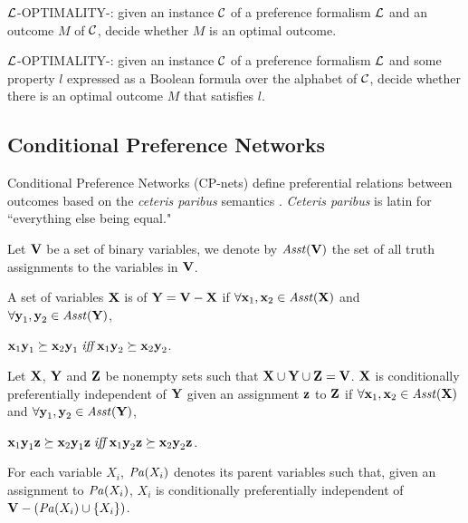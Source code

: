 \begin{definition}
\label{def:opt2}
  $\mathcal{L}$-OPTIMALITY-: given an instance $\mathcal{C}$ of a preference
	formalism $\mathcal{L}$ and an outcome $M$ of $\mathcal{C}$,
  decide whether $M$ is an optimal outcome.
\end{definition}

\begin{definition}
\label{def:opt3}
  $\mathcal{L}$-OPTIMALITY-: given an instance $\mathcal{C}$ of a preference
	formalism $\mathcal{L}$ and some property $l$ expressed as a Boolean formula 
	over the alphabet of $\mathcal{C}$,
  decide whether there is an optimal outcome $M$ that satisfies $l$.
\end{definition}



\subsection{Conditional Preference Networks}
Conditional Preference Networks (CP-nets) define preferential relations between outcomes
based on the \textit{ceteris paribus}
semantics \cite{bbdh03}.
\textit{Ceteris paribus} is latin for ``everything else being equal."

Let $\textbf{V}$ be a set of binary variables, we denote by $\mathit{Asst}(\textbf{V})$ the set of
all truth assignments to the variables in $\textbf{V}$.
\begin{definition}
\label{def:pi}
	A set of variables $\textbf{X}$ is 
	of $\textbf{Y}=\textbf{V}-\textbf{X}$ if $\forall \textbf{x}_1,\textbf{x}_2 \in \mathit{Asst}(\textbf{X})$ and
	$\forall \textbf{y}_1,\textbf{y}_2 \in \mathit{Asst}(\textbf{Y})$,
	\begin{center}
		$\textbf{x}_1\textbf{y}_1 \succeq \textbf{x}_2\textbf{y}_1 \; \textit{iff} \; \textbf{x}_1\textbf{y}_2 \succeq \textbf{x}_2\textbf{y}_2$.
	\end{center}
\end{definition}

\begin{definition}
\label{def:cpi}
	Let $\textbf{X}$, $\textbf{Y}$ and $\textbf{Z}$ be nonempty sets such that
	$\textbf{X} \cup \textbf{Y} \cup \textbf{Z} = \textbf{V}$.
	$\textbf{X}$ is conditionally preferentially independent
	of $\textbf{Y}$ given an assignment $\textbf{z}$ to $\textbf{Z}$ 
	if $\forall \textbf{x}_1,\textbf{x}_2 \in \mathit{Asst}(\textbf{X})$ and
	$\forall \textbf{y}_1,\textbf{y}_2 \in \mathit{Asst}(\textbf{Y})$,
	\begin{center}
		$\textbf{x}_1\textbf{y}_1\textbf{z} \succeq \textbf{x}_2\textbf{y}_1\textbf{z} \; \textit{iff} \; \textbf{x}_1\textbf{y}_2\textbf{z} \succeq \textbf{x}_2\textbf{y}_2\textbf{z}$.
	\end{center}
\end{definition}

\begin{definition}
	For each variable $X_i$, $\mathit{Pa}(X_i)$ denotes its parent variables such that,
	given an assignment to $\mathit{Pa}(X_i)$, $X_i$ is conditionally preferentially independent
	of $\textbf{V}-(\mathit{Pa}(X_i) \cup \{X_i\})$.
\end{definition}

